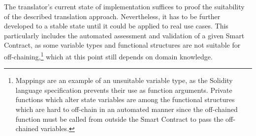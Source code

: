 The translator's current state of implementation suffices to proof the suitability of the described translation approach. Nevertheless, it has to be further developed to a stable state until it could be applied to real use cases. This particularly includes the automated assessment and validation of a given Smart Contract, as some variable types and functional structures are not suitable for off-chaining,\footnote{Mappings are an example of an unsuitable variable type, as the Solidity language specification prevents their use as function arguments. Private functions which alter state variables are among the functional structures which are hard to off-chain in an automated manner since the off-chained function must be called from outside the Smart Contract to pass the off-chained variables.} which at this point still depends on domain knowledge.
